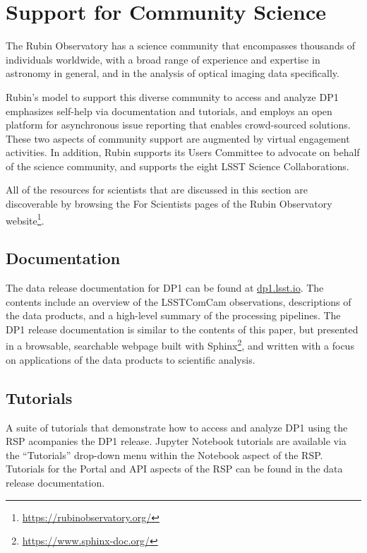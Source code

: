 \section{Support for Community Science
\label{sec:community_science}}

The Rubin Observatory has a science community that encompasses thousands of individuals worldwide, with a broad range of experience and expertise in astronomy in general, and in the analysis of optical imaging data specifically.

Rubin's model to support this diverse community to access and analyze \gls{DP1} emphasizes self-help via documentation and tutorials, and employs an open platform for asynchronous issue reporting that enables crowd-sourced solutions.
These two aspects of community support are augmented by virtual engagement activities.
In addition, Rubin supports its Users Committee to advocate on behalf of the science community, and supports the eight \gls{LSST} Science Collaborations.

All of the resources for scientists that are discussed in this section are discoverable by browsing the For Scientists pages of the Rubin Observatory website\footnote{\url{https://rubinobservatory.org/}}.

\subsection{Documentation
\label{ssec:documentation}}

The data release documentation for \gls{DP1} can be found at \url{dp1.lsst.io}.
The contents include an overview of the \gls{LSSTComCam} observations, descriptions of the data products, and a high-level summary of the processing pipelines.
The DP1 release documentation is similar to the contents of this paper, but presented in a browsable, searchable webpage built with Sphinx\footnote{\url{https://www.sphinx-doc.org/}}, and written with a focus on applications of the data products to scientific analysis.

\subsection{Tutorials
\label{ssec:tutorials}}

A suite of tutorials that demonstrate how to access and analyze \gls{DP1} using the RSP acompanies the DP1 release.
Jupyter Notebook tutorials are available via the ``Tutorials'' drop-down menu within the Notebook aspect of the \gls{RSP}.
Tutorials for the Portal and API aspects of the \gls{RSP} can be found in the data release documentation.

